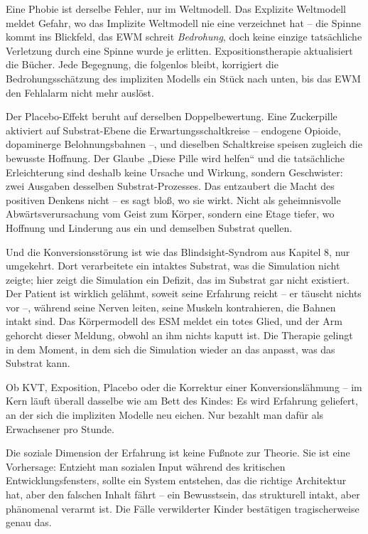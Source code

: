 \documentclass[11pt, twoside, openright]{book}
\begin{document}
Eine Phobie ist derselbe Fehler, nur im Weltmodell. Das Explizite Weltmodell meldet Gefahr, wo das Implizite Weltmodell nie eine verzeichnet hat -- die Spinne kommt ins Blickfeld, das EWM schreit \textit{Bedrohung}, doch keine einzige tatsächliche Verletzung durch eine Spinne wurde je erlitten. Expositionstherapie aktualisiert die Bücher. Jede Begegnung, die folgenlos bleibt, korrigiert die Bedrohungsschätzung des impliziten Modells ein Stück nach unten, bis das EWM den Fehlalarm nicht mehr auslöst.

Der Placebo-Effekt beruht auf derselben Doppelbewertung. Eine Zuckerpille aktiviert auf Substrat-Ebene die Erwartungsschaltkreise -- endogene Opioide, dopaminerge Belohnungsbahnen --, und dieselben Schaltkreise speisen zugleich die bewusste Hoffnung. Der Glaube „Diese Pille wird helfen“ und die tatsächliche Erleichterung sind deshalb keine Ursache und Wirkung, sondern Geschwister: zwei Ausgaben desselben Substrat-Prozesses. Das entzaubert die Macht des positiven Denkens nicht -- es sagt bloß, wo sie wirkt. Nicht als geheimnisvolle Abwärtsverursachung vom Geist zum Körper, sondern eine Etage tiefer, wo Hoffnung und Linderung aus ein und demselben Substrat quellen.

Und die Konversionsstörung ist wie das Blindsight-Syndrom aus Kapitel 8, nur umgekehrt. Dort verarbeitete ein intaktes Substrat, was die Simulation nicht zeigte; hier zeigt die Simulation ein Defizit, das im Substrat gar nicht existiert. Der Patient ist wirklich gelähmt, soweit seine Erfahrung reicht -- er täuscht nichts vor --, während seine Nerven leiten, seine Muskeln kontrahieren, die Bahnen intakt sind. Das Körpermodell des ESM meldet ein totes Glied, und der Arm gehorcht dieser Meldung, obwohl an ihm nichts kaputt ist. Die Therapie gelingt in dem Moment, in dem sich die Simulation wieder an das anpasst, was das Substrat kann.

Ob KVT, Exposition, Placebo oder die Korrektur einer Konversionslähmung -- im Kern läuft überall dasselbe wie am Bett des Kindes: Es wird Erfahrung geliefert, an der sich die impliziten Modelle neu eichen. Nur bezahlt man dafür als Erwachsener pro Stunde.

Die soziale Dimension der Erfahrung ist keine Fußnote zur Theorie. Sie ist eine Vorhersage: Entzieht man sozialen Input während des kritischen Entwicklungsfensters, sollte ein System entstehen, das die richtige Architektur hat, aber den falschen Inhalt fährt -- ein Bewusstsein, das strukturell intakt, aber phänomenal verarmt ist. Die Fälle verwilderter Kinder bestätigen tragischerweise genau das.
\end{document}
